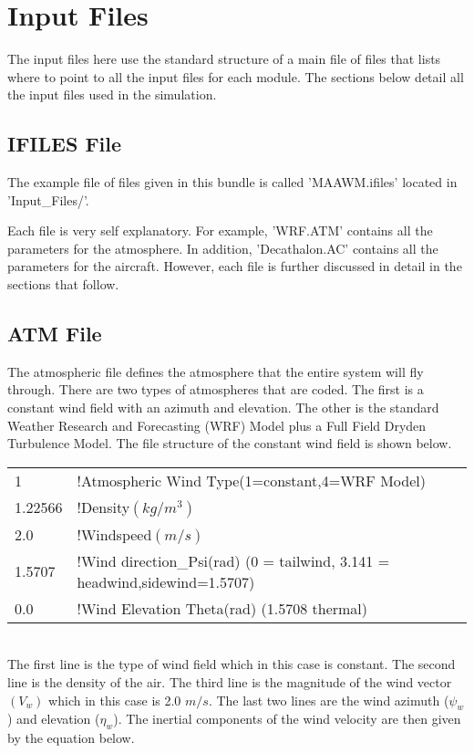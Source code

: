 \documentclass[letterpaper]{article}
\begin{document}
\section{Input Files}

The input files here use the standard structure of a main file of
files that lists where to point to all the input files for each
module. The sections below detail all the input files used in the
simulation. 

\subsection{IFILES File}

The example file of files given in this bundle is called 'MAAWM.ifiles'
located in 'Input\_Files/'. 

Each file is very self explanatory. For example, 'WRF.ATM' contains
all the parameters for the atmosphere. In addition, 'Decathalon.AC'
contains all the parameters for the aircraft. However, each file is further
discussed in detail in the sections that follow.

\subsection{ATM File}

The atmospheric file defines the atmosphere that the entire system
will fly through. There are two types of atmospheres that are
coded. The first is a constant wind field with an azimuth and
elevation. The other is the standard Weather Research and Forecasting (WRF)
Model plus a Full Field Dryden Turbulence Model. The file structure of
the constant wind field is shown below.

{\singlespace
\begin{tabular}{l l l}
1	& !Atmospheric Wind Type(1=constant,4=WRF Model) \\
1.22566 	& !Density$(kg/m^3)$\\
2.0	& !Windspeed$(m/s)$\\
1.5707 & !Wind direction\_Psi(rad) (0 = tailwind, 3.141 = headwind,sidewind=1.5707)\\
0.0     & !Wind Elevation Theta(rad) (1.5708 thermal)\\
\end{tabular}
}%
\\

The first line is the type of wind field which in this case is
constant. The second line is the density of the air. The third line is
the magnitude of the wind vector $(V_w)$ which in this case is 2.0
$m/s$. The last two lines are the wind azimuth ($\psi_w$) and
elevation ($\eta_w$). The inertial components of the wind velocity are
then given by the equation below. 
\end{document}
